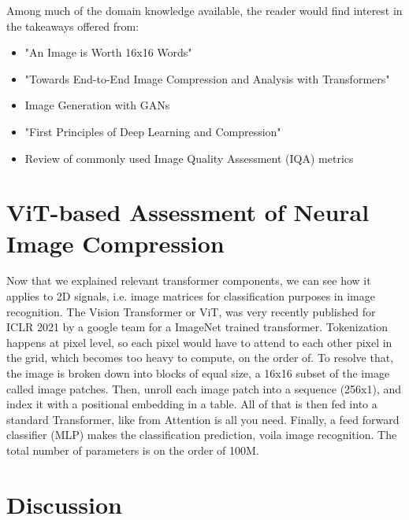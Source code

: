 \documentclass[pdftex,11pt,titlepage,twoside,openright]{report}
\begin{document}
Among much of the domain knowledge available, the reader would find interest in the 
takeaways offered from:

\begin{itemize}
	\item "An Image is Worth 16x16 Words" \citep{dosovitskiy2020vit}
	\item "Towards End-to-End Image Compression and Analysis with Transformers" 

    \citep{Bai2022AAAI}
    \item Image Generation with GANs
	\item "First Principles of Deep Learning and Compression" \citep{Principles}
	\item Review of commonly used Image Quality Assessment (IQA) metrics
    
    \citep{Metrics}
\end{itemize}

\ThinHRule

\newpage


\chapter{ViT-based Assessment of Neural Image Compression}

Now that we explained relevant transformer components, we can see how it applies to 
2D signals, i.e. image matrices for classification purposes in image recognition.
The Vision Transformer or ViT, was very recently published for ICLR 2021 by a google 
team for a ImageNet trained transformer.
Tokenization happens at pixel level, so each pixel would have to attend to each other 
pixel in the grid, which becomes too heavy to compute, on the order of. 
To resolve that, the image is broken down into blocks of equal size, a 16x16 subset 
of the image called image patches. Then, unroll each image patch into a sequence (256x1), 
and index it with a positional embedding in a table. All of that is then fed into a 
standard Transformer, like from Attention is all you need. Finally, a feed forward 
classifier (MLP) makes the classification prediction, voila image recognition.
The total number of parameters is on the order of 100M.

\ThinHRule

\newpage


\chapter{Discussion}
\end{document}
